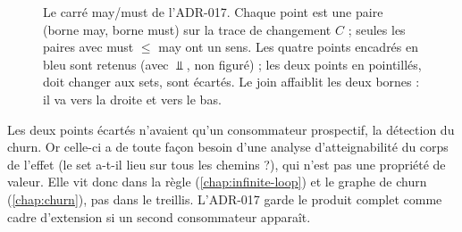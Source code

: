 \begin{figure}[htbp]\centering
{}
\caption{Le carré may/must de l'ADR-017. Chaque point est une paire (borne
may, borne must) sur la trace de changement $C$ ; seules les paires avec
must $\le$ may ont un sens. Les quatre points encadrés en bleu sont retenus
(avec $\Bot$, non figuré) ; les deux points en pointillés, \og doit changer
aux sets\fg{}, sont écartés. Le join affaiblit les deux bornes : il va vers
la droite et vers le bas.}
\label{fig:statevalue-stabilite-maymust}
\end{figure}

Les deux points écartés n'avaient qu'un consommateur prospectif, la
détection du churn. Or celle-ci a de toute façon besoin d'une analyse
d'atteignabilité du corps de l'effet (le set a-t-il lieu sur tous les
chemins ?), qui n'est pas une propriété de valeur. Elle vit donc dans la
règle (\cref{chap:infinite-loop}) et le graphe de churn
(\cref{chap:churn}), pas dans le treillis. L'ADR-017 garde le produit
complet comme cadre d'extension si un second consommateur apparaît.

